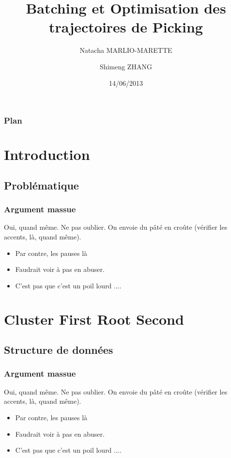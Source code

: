 \documentclass{polytech-presentation}
\title{Batching et Optimisation des trajectoires de Picking}
\author{Natacha MARLIO-MARETTE \and Shimeng ZHANG}
\date{14/06/2013}
\begin{document}
	\frame{\titlepage}
		
	
		 \begin{frame}
	    \frametitle{Plan}
	    \tableofcontents
	  \end{frame}
	
	\section{Introduction}
		\subsection{Problématique}
			
	\begin{frame}
	\frametitle{Argument massue}
				
		\begin{block}{Oui, quand même.}
					Ne pas oublier. On envoie du pâté en croûte (vérifier les accents, là, quand même).
		\end{block}
				
		\begin{itemize}
			\item Par contre, les pauses là \pause
			\item Faudrait voir à pas en abuser. \pause
			\item C'est pas que c'est un poil lourd ....
		\end{itemize}
				
	\end{frame}

	\section{Cluster First Root Second}
		\subsection{Structure de données}
			
	\begin{frame}
	\frametitle{Argument massue}
				
		\begin{block}{Oui, quand même.}
					Ne pas oublier. On envoie du pâté en croûte (vérifier les accents, là, quand même).
		\end{block}
				
		\begin{itemize}
			\item Par contre, les pauses là \pause
			\item Faudrait voir à pas en abuser. \pause
			\item C'est pas que c'est un poil lourd ....
		\end{itemize}
				
	\end{frame}
	
\end{document}
